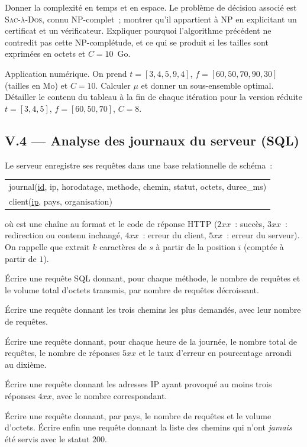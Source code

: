 \documentclass[11pt,a4paper]{article}
\begin{document}
\Q Donner la complexité en temps et en espace. Le problème de décision associé est
\textsc{Sac-à-Dos}, connu NP-complet~; montrer qu'il appartient à NP en explicitant un
certificat et un vérificateur. Expliquer pourquoi l'algorithme précédent ne contredit pas
cette NP-complétude, et ce qui se produit si les tailles sont exprimées en octets et
$C=10$~Go.

\Q Application numérique. On prend $t=[3,4,5,9,4]$, $f=[60,50,70,90,30]$ (tailles en Mo) et
$C=10$. Calculer $\mu$ et donner un sous-ensemble optimal. Détailler le contenu du tableau à
la fin de chaque itération pour la version réduite $t=[3,4,5]$, $f=[60,50,70]$, $C=8$.

\subsection*{V.4 --- Analyse des journaux du serveur (SQL)}

Le serveur enregistre ses requêtes dans une base relationnelle de schéma~:
\begin{center}\ttfamily\small
\begin{tabular}{l}
journal(\underline{id}, ip, horodatage, methode, chemin, statut, octets, duree\_ms)\\
client(\underline{ip}, pays, organisation)
\end{tabular}
\end{center}
où  est une chaîne au format  et 
le code de réponse HTTP ($2xx$~: succès, $3xx$~: redirection ou contenu inchangé, $4xx$~:
erreur du client, $5xx$~: erreur du serveur). On rappelle que  extrait
$k$ caractères de $s$ à partir de la position $i$ (comptée à partir de $1$).

\Q Écrire une requête SQL donnant, pour chaque méthode, le nombre de requêtes et le volume
total d'octets transmis, par nombre de requêtes décroissant.

\Q Écrire une requête donnant les trois chemins les plus demandés, avec leur nombre de
requêtes.

\Q Écrire une requête donnant, pour chaque heure de la journée, le nombre total de requêtes,
le nombre de réponses $5xx$ et le taux d'erreur en pourcentage arrondi au dixième.

\Q Écrire une requête donnant les adresses IP ayant provoqué au moins trois réponses $4xx$,
avec le nombre correspondant.

\Q Écrire une requête donnant, par pays, le nombre de requêtes et le volume d'octets. Écrire
enfin une requête donnant la liste des chemins qui n'ont \emph{jamais} été servis avec le
statut $200$.
\end{document}
